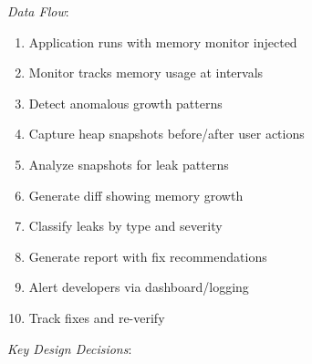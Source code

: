 \documentclass[11pt]{article}
\begin{document}
\emph{Data Flow}:

\begin{enumerate}
\item Application runs with memory monitor injected
\item Monitor tracks memory usage at intervals
\item Detect anomalous growth patterns
\item Capture heap snapshots before/after user actions
\item Analyze snapshots for leak patterns
\item Generate diff showing memory growth
\item Classify leaks by type and severity
\item Generate report with fix recommendations
\item Alert developers via dashboard/logging
\item Track fixes and re-verify
\end{enumerate}

\emph{Key Design Decisions}:
\end{document}
